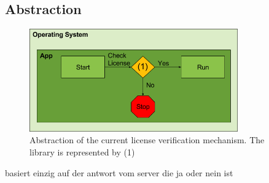 \subsection{Abstraction} \label{subsection:license-abstraction}
\begin{figure}[h]
    \centering
    \includegraphics[width=0.8\textwidth]{data/verificationNow.png}
    \caption{Abstraction of the current license verification mechanism. The library is represented by (1)}
    \label{fig:verificationNow}
\end{figure}


basiert einzig auf der antwort vom server die ja oder nein ist
